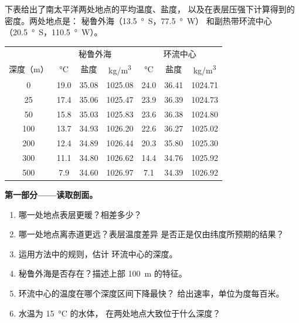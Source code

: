 \begin{problem}
\label{pb:g10:layered-ocean:1}
下表给出了南太平洋两处地点的平均温度、盐度，
以及在表层压强下计算得到的密度。两处地点是：
秘鲁外海（\qty{13.5}{\degree S}，\qty{77.5}{\degree W}）
和副热带环流中心（\qty{20.5}{\degree S}，\qty{110.5}{\degree W}）。

\begin{center}
\small
\begin{tabular}{c|ccc|ccc}
\hline
 & \multicolumn{3}{c|}{秘鲁外海} & \multicolumn{3}{c}{环流中心} \\
深度（\unit{m}） & \unit{\degreeCelsius} & 盐度 & \unit{kg/m^3} & \unit{\degreeCelsius} & 盐度 & \unit{kg/m^3} \\
\hline
0 & 19.0 & 35.08 & 1025.08 & 24.0 & 36.41 & 1024.71 \\
25 & 17.4 & 35.06 & 1025.47 & 23.9 & 36.39 & 1024.73 \\
50 & 15.8 & 35.03 & 1025.83 & 23.6 & 36.38 & 1024.80 \\
100 & 13.7 & 34.93 & 1026.20 & 22.6 & 36.27 & 1025.02 \\
200 & 12.4 & 34.89 & 1026.44 & 20.3 & 35.80 & 1025.30 \\
300 & 11.1 & 34.80 & 1026.62 & 14.4 & 34.76 & 1025.92 \\
500 & 7.9 & 34.60 & 1026.97 & 7.1 & 34.39 & 1026.92 \\
\hline
\end{tabular}
\end{center}

\medskip
\noindent\textbf{第一部分——读取剖面。}
\begin{enumerate}
  \item 哪一处地点表层更暖？相差多少？
        \item 哪一处地点离赤道更远？表层温度差异
        是否正是仅由纬度所预期的结果？
  \item 运用方法中的规则，估计
        环流中心的深度。
  \item 秘鲁外海是否存在？描述上部 \qty{100}{m} 的特征。
  \item 环流中心的温度在哪个深度区间下降最快？
        给出速率，单位为度每百米。
  \item 水温为 \qty{15}{\degreeCelsius} 的水体，
        在两处地点大致位于什么深度？
\end{enumerate}


\end{problem}
